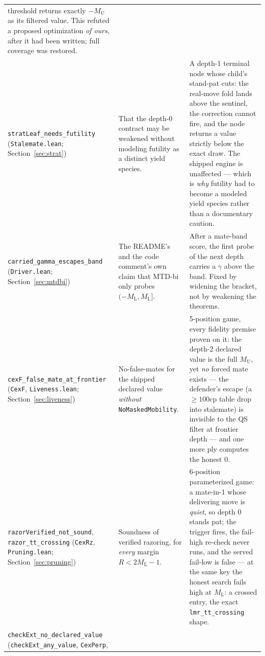 \documentclass[11pt]{article}
\newcommand{\MU}{M_{\mathrm{U}}}    %
\newcommand{\ML}{M_{\mathrm{L}}}    %
\theoremstyle{plain}
\theoremstyle{definition}
\theoremstyle{remark}
\begin{document}
{\begin{longtable}{@{}p{4.4cm}p{4.2cm}p{5.9cm}@{}}
threshold returns exactly $-\MU$ as its filtered value.  This refuted a
proposed optimization \emph{of ours}, after it had been written; full
coverage was restored.\\
\addlinespace
\texttt{stratLeaf\_needs\_futility} \newline (\texttt{Stalemate.lean};
Section~\ref{sec:strat}) &
That the depth-0 contract may be weakened without modeling futility as
a distinct yield species. &
A depth-1 terminal node whose child's stand-pat cuts: the real-move
fold lands above the sentinel, the correction cannot fire, and the node
returns a value strictly below the exact draw.  The shipped engine is
unaffected --- which is \emph{why} futility had to become a modeled
yield species rather than a documentary caution.\\
\addlinespace
\texttt{carried\_gamma\_escapes\_band} \newline (\texttt{Driver.lean};
Section~\ref{sec:mtdbi}) &
The README's and the code comment's own claim that MTD-bi only probes
$(-\ML, \ML]$. &
After a mate-band score, the first probe of the next depth carries a
$\gamma$ above the band.  Fixed by widening the bracket, not by
weakening the theorems.\\
\addlinespace
\texttt{cexF\_false\_mate\_at\_frontier} \newline (\texttt{CexF},
\texttt{Liveness.lean}; Section~\ref{sec:liveness}) &
No-false-mates for the shipped declared value \emph{without}
\texttt{NoMaskedMobility}. &
5-position game, every fidelity premise proven on it: the depth-2
declared value is the full $\MU$, yet \emph{no} forced mate exists ---
the defender's escape (a $\ge 100$cp table drop into stalemate) is
invisible to the QS filter at frontier depth --- and one more ply
computes the honest $0$.\\
\addlinespace
\texttt{razorVerified\_not\_sound}, \texttt{razor\_tt\_crossing}
\newline (\texttt{CexRz}, \texttt{Pruning.lean};
Section~\ref{sec:pruning}) &
Soundness of verified razoring, for \emph{every} margin
$R < 2\ML - 1$. &
6-position parameterized game: a mate-in-1 whose delivering move is
\emph{quiet}, so depth 0 stands pat; the trigger fires, the fail-high
re-check never runs, and the served fail-low is false --- at the same
key the honest search fails high at $\ML$: a crossed entry, the exact
\texttt{lmr\_tt\_crossing} shape.\\
\addlinespace
\texttt{checkExt\_no\_declared\_value} \newline
(\texttt{checkExt\_any\_value}, \texttt{CexPerp},

\end{longtable}}
\end{document}
